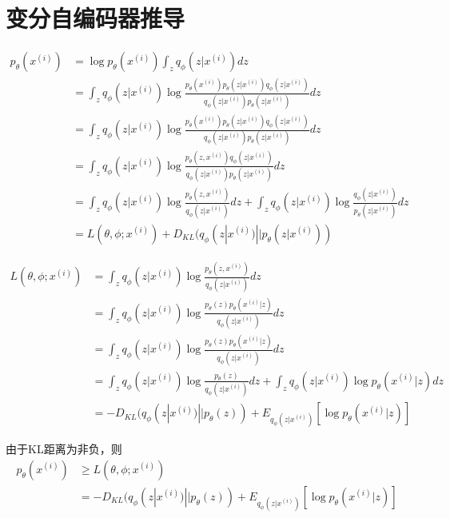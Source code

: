 \documentclass{ctexart}
\begin{document}
\section{变分自编码器推导}
\begin{align*}
p_\theta (x^{(i)})
&=\log p_\theta (x^{(i)}) \int_z q_{\phi}  (z | x^{(i)}) dz\\
&=  \int_z q_{\phi}  (z | x^{(i)}) \log \frac{p_\theta (x^{(i)}) p_{\theta}  (z | x^{(i)}) q_{\phi}  (z | x^{(i)})}{q_{\phi}  (z | x^{(i)}) p_{\theta}  (z | x^{(i)})} dz\\
&=  \int_z q_{\phi}  (z | x^{(i)}) \log \frac{p_\theta (x^{(i)}) p_{\theta}  (z | x^{(i)}) q_{\phi}  (z | x^{(i)})}{q_{\phi}  (z | x^{(i)}) p_{\theta}  (z | x^{(i)})} dz\\
&=  \int_z q_{\phi}  (z | x^{(i)}) \log \frac{p_\theta (z,x^{(i)}) q_{\phi}(z | x^{(i)}) }{ q_{\phi}  (z | x^{(i)}) p_{\theta}  (z | x^{(i)})} dz\\
&= \int_z q_{\phi}(z | x^{(i)}) \log \frac{p_\theta (z,x^{(i)})}{ q_{\phi}(z | x^{(i)})} dz + \int_z q_{\phi}(z | x^{(i)}) \log \frac{q_\phi (z | x^{(i)})}{ p_{\theta}(z | x^{(i)})} dz\\
&= L(\theta, \phi; x^{(i)}) + D_{KL}(q_{\phi}(z | x^{(i)}) || p_{\theta}  (z | x^{(i)}))
\end{align*}

\begin{align*}
L(\theta, \phi; x^{(i)})
&= \int_z q_{\phi}(z | x^{(i)}) \log \frac{p_\theta (z,x^{(i)})}{ q_{\phi}(z | x^{(i)})} dz\\
&= \int_z q_{\phi}(z | x^{(i)}) \log \frac{p_\theta (z) p_\theta (x^{(i)} | z)}{ q_{\phi}(z | x^{(i)})} dz\\
&= \int_z q_{\phi}(z | x^{(i)}) \log \frac{p_\theta (z) p_\theta (x^{(i)} | z)}{ q_{\phi}(z | x^{(i)})} dz \\
&= \int_z q_{\phi}(z | x^{(i)}) \log \frac{p_\theta (z) }{ q_{\phi}(z | x^{(i)})} dz +  \int_z q_{\phi}(z | x^{(i)}) \log p_\theta (x^{(i)} | z) dz \\
&= -D_{KL}(q_{\phi}(z | x^{(i)}) || p_\theta (z)) + E_{q_{\phi}(z | x^{(i)})}[\log p_\theta (x^{(i)} | z) ]
\end{align*}

由于KL距离为非负，则
\begin{align*}
p_\theta (x^{(i)}) 
&\geq L(\theta, \phi; x^{(i)})\\
&= -D_{KL}(q_{\phi}(z | x^{(i)}) || p_\theta (z)) + E_{q_{\phi}(z | x^{(i)})}[\log p_\theta (x^{(i)} | z) ]
\end{align*}
\end{document}

